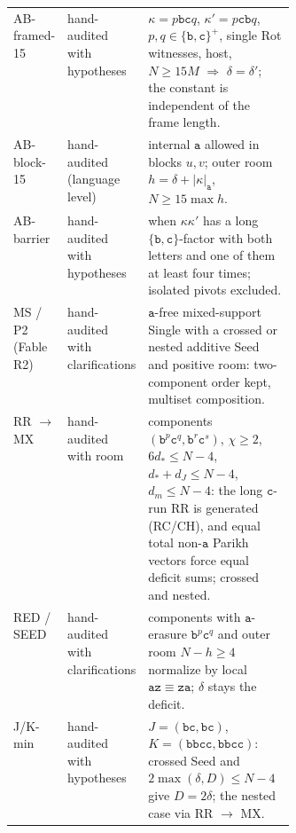 \documentclass[11pt]{article}
\numberwithin{equation}{section}
\theoremstyle{plain}
\theoremstyle{definition}
\theoremstyle{remark}
\theoremstyle{plain}
\begin{document}
\begin{center}
\begin{tabularx}{\linewidth}{@{}>{\raggedright\arraybackslash}p{0.17\linewidth}>{\raggedright\arraybackslash}p{0.2\linewidth}X@{}}
AB-framed-15 & hand-audited with hypotheses & $\kappa=p\mathtt{bc}q$, $\kappa'=p\mathtt{cb}q$, $p,q\in\{\mathtt b,\mathtt c\}^+$, single Rot witnesses, host, $N\ge15M$ $\Rightarrow$ $\delta=\delta'$; the constant is independent of the frame length.\\
AB-block-15 & hand-audited (language level) & internal $\mathtt a$ allowed in blocks $u,v$; outer room $h=\delta+|\kappa|_{\mathtt a}$, $N\ge15\max h$.\\
AB-barrier & hand-audited with hypotheses & when $\kappa\kappa'$ has a long $\{\mathtt b,\mathtt c\}$-factor with both letters and one of them at least four times; isolated pivots excluded.\\
MS / P2 (Fable R2) & hand-audited with clarifications & $\mathtt a$-free mixed-support Single with a crossed or nested additive Seed and positive room: two-component order kept, multiset composition.\\
RR $\to$ MX & hand-audited with room & components $(\mathtt b^p\mathtt c^q,\mathtt b^r\mathtt c^s)$, $\chi\ge2$, $6d_*\le N-4$, $d_*+d_J\le N-4$, $d_m\le N-4$: the long $\mathtt c$-run RR is generated (RC/CH), and equal total non-$\mathtt a$ Parikh vectors force equal deficit sums; crossed and nested.\\
RED / SEED & hand-audited with clarifications & components with $\mathtt a$-erasure $\mathtt b^p\mathtt c^q$ and outer room $N-h\ge4$ normalize by local $\mathtt{az}\equiv\mathtt{za}$; $\delta$ stays the deficit.\\
J/K-min & hand-audited with hypotheses & $J=(\mathtt{bc},\mathtt{bc})$, $K=(\mathtt{bbcc},\mathtt{bbcc})$: crossed Seed and $2\max(\delta,D)\le N-4$ give $D=2\delta$; the nested case via RR $\to$ MX.\\
\hline
\end{tabularx}
\end{center}
\end{document}
